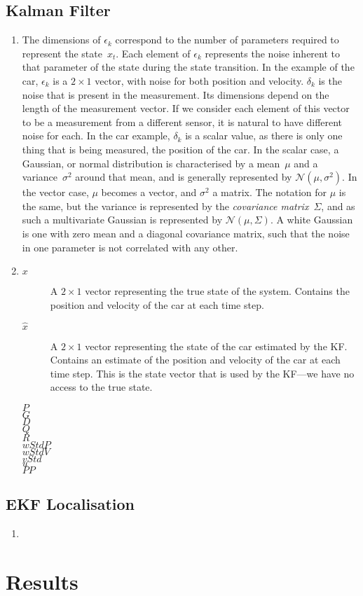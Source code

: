 \documentclass[a4paper,12pt]{article}
\begin{document}
\subsection{Kalman Filter}
\begin{enumerate}
\item The dimensions of $\epsilon_k$ correspond to the number of parameters
  required to represent the state~$x_t$. Each element of $\epsilon_k$ represents
  the noise inherent to that parameter of the state during the state
  transition. In the example of the car, $\epsilon_k$ is a $2\times 1$ vector,
  with noise for both position and velocity. $\delta_k$ is the noise that is
  present in the measurement. Its dimensions depend on the length of the
  measurement vector. If we consider each element of this vector to be a
  measurement from a different sensor, it is natural to have different noise for
  each. In the car example, $\delta_k$ is a scalar value, as there is only one
  thing that is being measured, the position of the car. In the scalar case, a
  Gaussian, or normal distribution is characterised by a mean~$\mu$ and a
  variance~$\sigma^2$ around that mean, and is generally represented by
  $\mathcal{N}(\mu,\sigma^2)$. In the vector case, $\mu$ becomes a vector, and
  $\sigma^2$ a matrix. The notation for $\mu$ is the same, but the variance is
  represented by the \emph{covariance matrix}~$\Sigma$, and as such a
  multivariate Gaussian is represented by $\mathcal{N}(\mu,\Sigma)$. A white
  Gaussian is one with zero mean and a diagonal covariance matrix, such that the
  noise in one parameter is not correlated with any other.
\item 
  \begin{description}
  \item[$x$] A $2\times 1$ vector representing the true state of the
    system. Contains the position and velocity of the car at each time step.
  \item[$\hat{x}$] A $2\times 1$ vector representing the state of the car
    estimated by the KF. Contains an estimate of the position and velocity of
    the car at each time step. This is the state vector that is used by the
    KF---we have no access to the true state.
  \item[$P$]
  \item[$G$]
  \item[$D$]
  \item[$Q$]
  \item[$R$]
  \item[$wStdP$]
  \item[$wStdV$]
  \item[$vStd$]
  \item[$u$]
  \item[$PP$] 
  \end{description}
\end{enumerate}
\subsection{EKF Localisation}
\begin{enumerate}[resume]
\item 
\end{enumerate}
\section{Results}
\end{document}
